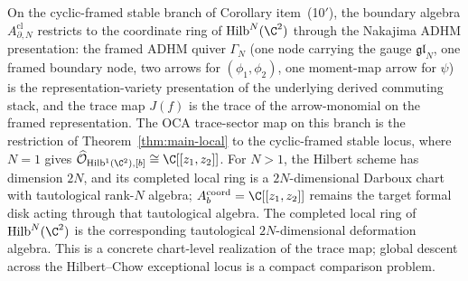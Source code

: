 \begin{rmk}\label{rmk:nakajima-quiver-OCA}
On the cyclic-framed stable branch of Corollary item~(10$'$), the
boundary algebra \(A^{\mathrm{cl}}_{\partial,N}\) restricts to the
coordinate ring of \(\mathrm{Hilb}^N(\C^2)\) through the Nakajima
ADHM presentation: the framed ADHM quiver \(\Gamma_N\) (one node
carrying the gauge \(\mathfrak{gl}_N\), one framed boundary node, two
arrows for \((\phi_1,\phi_2)\), one moment-map arrow for \(\psi\)) is
the representation-variety presentation of the underlying derived
commuting stack, and the trace map \(J(f)\) is the trace of the
arrow-monomial on the framed representation.  The OCA trace-sector
map on this branch is the restriction of
Theorem~\ref{thm:main-local} to the cyclic-framed stable locus,
where \(N=1\) gives
\(\widehat{\mathcal O}_{\mathrm{Hilb}^1(\C^2),[b]}\cong\C[[z_1,z_2]]\).
For \(N>1\), the Hilbert scheme has dimension \(2N\), and its completed
local ring is a \(2N\)-dimensional Darboux chart with tautological
rank-\(N\) algebra; \(A_b^{\mathrm{coord}}=\C[[z_1,z_2]]\) remains the
target formal disk acting through that tautological algebra.  The
completed local ring of \(\mathrm{Hilb}^N(\C^2)\) is the corresponding
tautological \(2N\)-dimensional deformation algebra.  This is a
concrete chart-level realization of the trace map; global descent
across the Hilbert--Chow exceptional locus is a compact comparison
problem.
\end{rmk}

